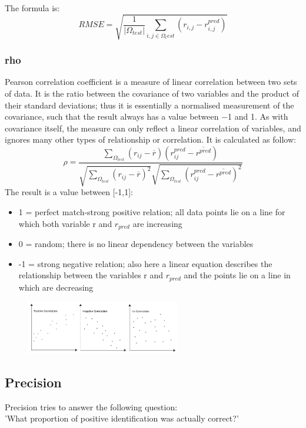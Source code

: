 \documentclass{article}
\begin{document}
The formula is:
\begin{equation}
      RMSE = \sqrt{\frac{1}{|\Omega_{test}|}\sum_{i,j\in\Omega_test} (r_{i,j} - r_{i,j}^{pred})}
\end{equation}
\subsubsection{rho}
Pearson correlation coefficient is a measure of linear correlation between two sets of data. It is the ratio between the covariance of two variables and the product of their standard deviations; thus it is essentially a normalised measurement of the covariance, such that the result always has a value between −1 and 1. As with covariance itself, the measure can only reflect a linear correlation of variables, and ignores many other types of relationship or correlation.
It is calculated as follow:
\begin{equation}
      \rho = \frac{\sum_{\Omega_{test}} (r_{ij}-\overline{r})(r_{ij}^{pred}-\overline{r^{pred}})}{{\sqrt{\sum_{\Omega_{test}}(r_{ij}-\overline{r})^2}}{\sqrt{\sum_{\Omega_{test}}(r_{ij}^{pred}-\overline{r^{pred}})^2}}}
\end{equation}
The result is a value between [-1,1]:
\begin{itemize}
      \item 1 = perfect match-strong positive relation; all data points lie on a line for which both variable r and $r_{pred}$ are increasing
      \item 0 = random; there is no linear dependency between the variables
      \item -1 = strong negative relation; also here a linear equation describes the relationship between the variables r and $r_{pred}$ and the points lie on a line in which are decreasing
\end{itemize}
\begin{figure}[ht]
      \begin{center}
            \includegraphics[width=0.6\textwidth]{images/pearson.png}
      \end{center}
\end{figure}

\subsection{Precision}
Precision tries to answer the following question:\\
'What proportion of positive identification was actually correct?'
\end{document}
